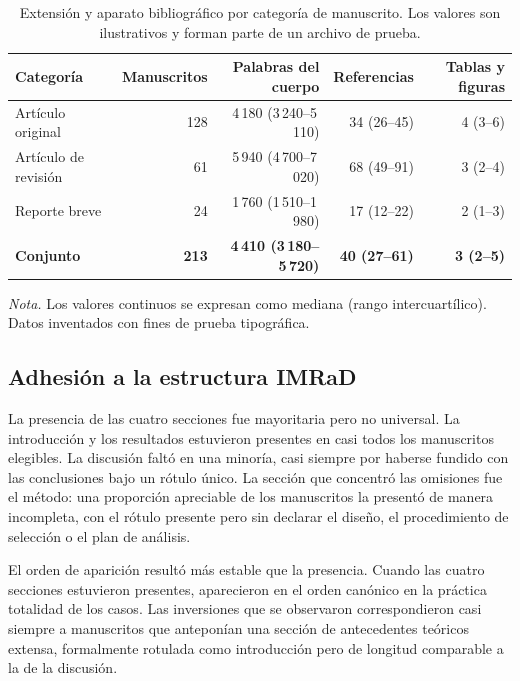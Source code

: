 \documentclass{apm-editorial}
\begin{document}
\begin{table}[t]
\centering
\caption{Extensión y aparato bibliográfico por categoría de manuscrito.
Los valores son ilustrativos y forman parte de un archivo de prueba.}
\label{tab:extension}
\begin{tabular}{lrrrr}
\toprule
\textbf{Categoría} & \textbf{Manuscritos} & \textbf{Palabras del cuerpo} &
\textbf{Referencias} & \textbf{Tablas y figuras} \\
\midrule
Artículo original  & 128 & 4\,180 (3\,240--5\,110) & 34 (26--45) & 4 (3--6) \\
Artículo de revisión & 61 & 5\,940 (4\,700--7\,020) & 68 (49--91) & 3 (2--4) \\
Reporte breve      & 24 & 1\,760 (1\,510--1\,980) & 17 (12--22) & 2 (1--3) \\
\midrule
\textbf{Conjunto}  & \textbf{213} & \textbf{4\,410 (3\,180--5\,720)} &
\textbf{40 (27--61)} & \textbf{3 (2--5)} \\
\bottomrule
\end{tabular}

\vspace{3pt}
{\footnotesize\textit{Nota.} Los valores continuos se expresan como mediana
(rango intercuartílico). Datos inventados con fines de prueba tipográfica.}
\end{table}

\subsection*{Adhesión a la estructura IMRaD}

La presencia de las cuatro secciones fue mayoritaria pero no universal.
La introducción y los resultados estuvieron presentes en casi todos los
manuscritos elegibles. La discusión faltó en una minoría, casi siempre
por haberse fundido con las conclusiones bajo un rótulo único. La
sección que concentró las omisiones fue el método: una proporción
apreciable de los manuscritos la presentó de manera incompleta, con el
rótulo presente pero sin declarar el diseño, el procedimiento de
selección o el plan de análisis.

El orden de aparición resultó más estable que la presencia. Cuando las
cuatro secciones estuvieron presentes, aparecieron en el orden canónico
en la práctica totalidad de los casos. Las inversiones que se
observaron correspondieron casi siempre a manuscritos que anteponían
una sección de antecedentes teóricos extensa, formalmente rotulada como
introducción pero de longitud comparable a la de la discusión.
\end{document}

